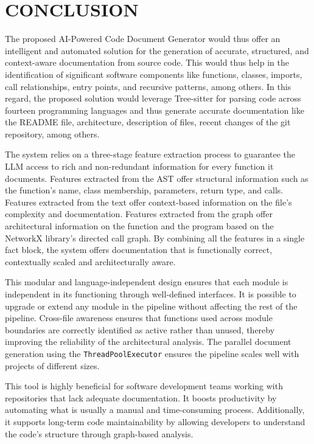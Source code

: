\chapter{CONCLUSION}

\hspace{0.5cm} The proposed AI-Powered Code Document Generator would thus offer an intelligent and automated solution for the generation of accurate, structured, and context-aware documentation from source code. This would thus help in the identification of significant software components like functions, classes, imports, call relationships, entry points, and recursive patterns, among others. In this regard, the proposed solution would leverage Tree-sitter for parsing code across fourteen programming languages and thus generate accurate documentation like the README file, architecture, description of files, recent changes of the git repository, among others.

\par The system relies on a three-stage feature extraction process to guarantee the LLM access to rich and non-redundant information for every function it documents. Features extracted from the AST offer structural information such as the function’s name, class membership, parameters, return type, and calls. Features extracted from the text offer context-based information on the file’s complexity and documentation. Features extracted from the graph offer architectural information on the function and the program based on the NetworkX library’s directed call graph. By combining all the features in a single fact block, the system offers documentation that is functionally correct, contextually scaled and architecturally aware.

\par This modular and language-independent design ensures that each module is independent in its functioning through well-defined interfaces. It is possible to upgrade or extend any module in the pipeline without affecting the rest of the pipeline. Cross-file awareness ensures that functions used across module boundaries are correctly identified as active rather than unused, thereby improving the reliability of the architectural analysis. The parallel document generation using the \texttt{ThreadPoolExecutor} ensures the pipeline scales well with projects of different sizes.

\par This tool is highly beneficial for software development teams working with repositories that lack adequate documentation. It boosts productivity by automating what is usually a manual and time-consuming process. Additionally, it supports long-term code maintainability by allowing developers to understand the code’s structure through graph-based analysis.

